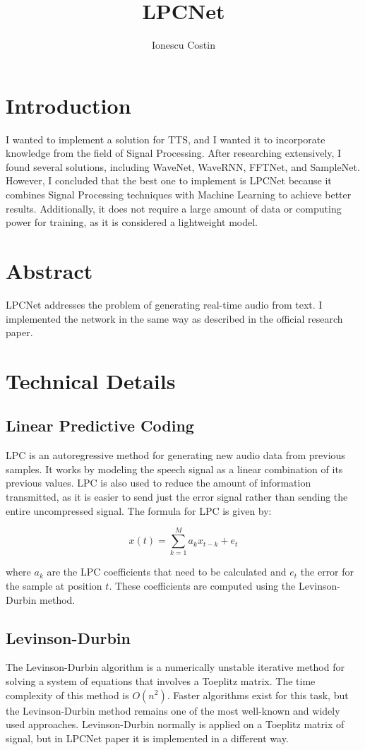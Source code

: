 \documentclass{article}
\title{\Huge\textbf{LPCNet}}
\author{\LARGE{Ionescu Costin}}
\date{}
\begin{document}
\maketitle
\newpage

\tableofcontents
\newpage

\section{Introduction}
\quad I wanted to implement a solution for TTS, and I wanted it to incorporate knowledge from the field of Signal Processing. After researching extensively, I found several solutions, including WaveNet, WaveRNN, FFTNet, and SampleNet. However, I concluded that the best one to implement is LPCNet because it combines Signal Processing techniques with Machine Learning to achieve better results. Additionally, it does not require a large amount of data or computing power for training, as it is considered a lightweight model.

\section{Abstract}
\quad LPCNet addresses the problem of generating real-time audio from text. I implemented the network in the same way as described in the official research paper.

\section{Technical Details}

\subsection{Linear Predictive Coding}
\quad LPC is an autoregressive method for generating new audio data from previous samples. It works by modeling the speech signal as a linear combination of its previous values. LPC is also used to reduce the amount of information transmitted, as it is easier to send just the error signal rather than sending the entire uncompressed signal. The formula for LPC is given by:

\[
x(t) = \sum_{k=1}^{M}{a_k x_{t-k} + e_t}
\]

where \(a_k\) are the LPC coefficients that need to be calculated and \(e_t\) the error for the sample at position \(t\). These coefficients are computed using the Levinson-Durbin method.

\subsection{Levinson-Durbin}
\quad The Levinson-Durbin algorithm is a numerically unstable iterative method for solving a system of equations that involves a Toeplitz matrix. The time complexity of this method is \(O(n^2)\). Faster algorithms exist for this task, but the Levinson-Durbin method remains one of the most well-known and widely used approaches. Levinson-Durbin normally is applied on a Toeplitz matrix of signal, but in LPCNet paper it is implemented in a different way.
\end{document}
